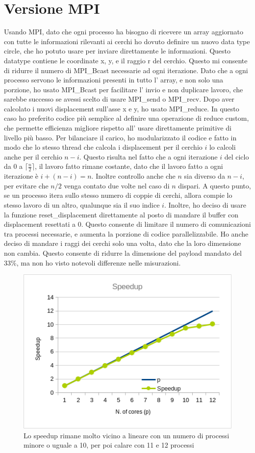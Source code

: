 \documentclass[a4paper,11pt, twoside]{report}
\begin{document}
\section*{Versione MPI}
Usando MPI, dato che ogni processo ha bisogno di ricevere un array aggiornato con tutte le informazioni rilevanti ai cerchi
ho dovuto definire un nuovo data type circle, che ho potuto usare per inviare direttamente le informazioni.
Questo datatype contiene le coordinate x, y, e il raggio r del cerchio. %
Questo mi consente di ridurre il numero di MPI\_Bcast necessarie ad ogni iterazione.
Dato che a ogni processo servono le informazioni presenti in tutto l' array, e non solo una porzione, ho usato MPI\_Bcast per facilitare l' invio e non duplicare lavoro,
che sarebbe successo se avessi scelto di usare MPI\_send o  MPI\_recv.
Dopo aver calcolato i nuovi displacement sull'asse x e y, ho usato MPI\_reduce.
In questo caso ho preferito codice più semplice al definire una operazione di reduce custom,
che permette efficienza migliore rispetto all' usare direttamente primitive di livello più basso.
Per bilanciare il carico, ho modularizzato il codice e fatto in modo che lo stesso thread che calcola i displacement per il cerchio $i$ lo calcoli anche per il cerchio $n-i$.
Questo risulta nel fatto che a ogni iterazione $i$ del ciclo da $0$ a $\lceil \frac{n}{2} \rceil$, il lavoro fatto rimane costante, dato che il lavoro fatto a ogni iterazione è $i + (n-i) = n$.
Inoltre controllo anche che $n$ sia diverso da $n-i$, per evitare che $n/2$ venga contato due volte nel caso di $n$ dispari.
A questo punto, se un processo itera sullo stesso numero di coppie di cerchi, allora compie lo stesso lavoro di un altro, qualunque sia il suo indice $i$.
Inoltre, ho deciso di usare la funzione reset\_displacement direttamente al posto di mandare il buffer con displacement resettati a 0.
Questo consente di limitare il numero di comunicazioni tra processi necessarie, e aumenta la porzione di codice parallelizzabile.
Ho anche deciso di mandare i raggi dei cerchi solo una volta, dato che la loro dimensione non cambia.
Questo consente di ridurre la dimensione del payload mandato del 33\%, ma non ho visto notevoli differenze nelle misurazioni.
\begin{figure}[H]
    \includegraphics[scale=0.5]{images/mpi_speedup.png}
    \caption[]{Lo speedup rimane molto vicino a lineare con un numero di processi minore o uguale a 10, per poi calare con 11 e 12 processi}
\end{figure}
\end{document}
